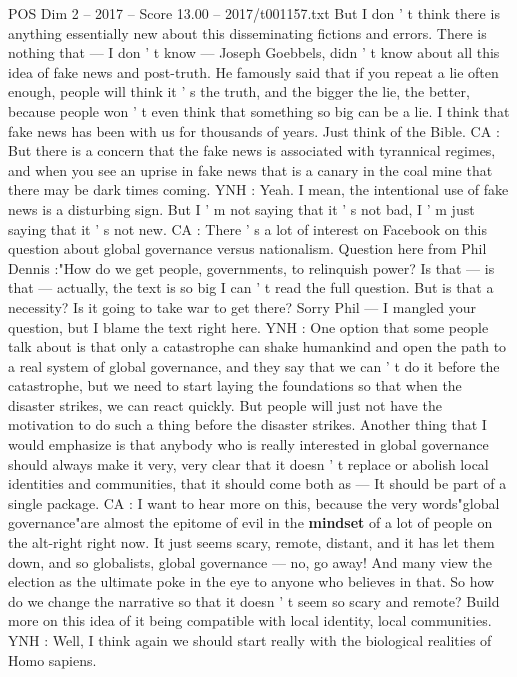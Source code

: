 \begin{textsample}{POS Dim 2 – 2017 – Score 13.00 – 2017/t001157.txt}
But I don ' t think there is anything essentially new about this disseminating fictions and errors.
There is nothing that — I don ' t know — Joseph Goebbels, didn ' t know about all this idea of fake news and post-truth.
He famously said that if you repeat a lie often enough, people will think it ' s the truth, and the bigger the lie, the better, because people won ' t even think that something so big can be a lie.
I think that fake news has been with us for thousands of years.
Just think of the Bible.
CA : But there is a concern that the fake news is associated with tyrannical regimes, and when you see an uprise in fake news that is a canary in the coal mine that there may be dark times coming.
YNH : Yeah.
I mean, the intentional use of fake news is a disturbing sign.
But I ' m not saying that it ' s not bad, I ' m just saying that it ' s not new.
CA : There ' s a lot of interest on Facebook on this question about global governance versus nationalism.
Question here from Phil Dennis :"How do we get people, governments, to relinquish power?
Is that — is that — actually, the text is so big I can ' t read the full question.
But is that a necessity?
Is it going to take war to get there?
Sorry Phil — I mangled your question, but I blame the text right here.
YNH : One option that some people talk about is that only a catastrophe can shake humankind and open the path to a real system of global governance, and they say that we can ' t do it before the catastrophe, but we need to start laying the foundations so that when the disaster strikes, we can react quickly.
But people will just not have the motivation to do such a thing before the disaster strikes.
Another thing that I would emphasize is that anybody who is really interested in global governance should always make it very, very clear that it doesn ' t replace or abolish local identities and communities, that it should come both as — It should be part of a single package.
CA : I want to hear more on this, because the very words"global governance"are almost the epitome of evil in the \textbf{mindset} of a lot of people on the alt-right right now.
It just seems scary, remote, distant, and it has let them down, and so globalists, global governance — no, go away!
And many view the election as the ultimate poke in the eye to anyone who believes in that.
So how do we change the narrative so that it doesn ' t seem so scary and remote?
Build more on this idea of it being compatible with local identity, local communities.
YNH : Well, I think again we should start really with the biological realities of Homo sapiens.

\end{textsample}
